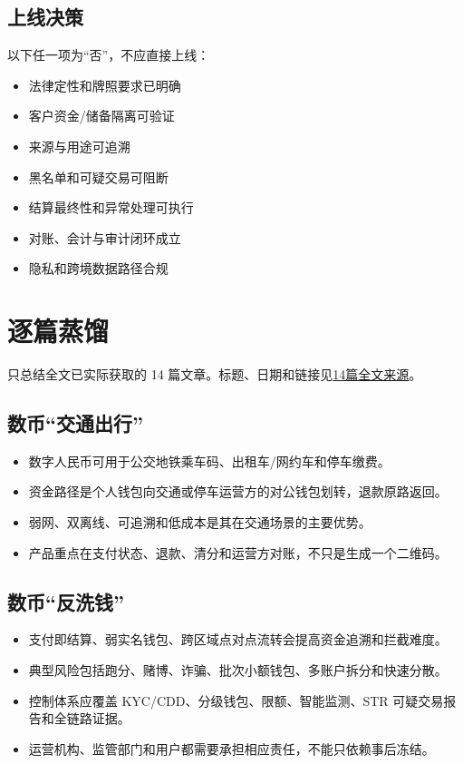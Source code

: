 \section{上线决策}\label{ux4e0aux7ebfux51b3ux7b56}

以下任一项为``否''，不应直接上线：

\begin{itemize}
\tightlist
\item
  法律定性和牌照要求已明确
\item
  客户资金/储备隔离可验证
\item
  来源与用途可追溯
\item
  黑名单和可疑交易可阻断
\item
  结算最终性和异常处理可执行
\item
  对账、会计与审计闭环成立
\item
  隐私和跨境数据路径合规
\end{itemize}

\chapter{逐篇蒸馏}\label{ux9010ux7bc7ux84b8ux998f}

只总结全文已实际获取的 14
篇文章。标题、日期和链接见\href{14篇全文来源.md}{14篇全文来源}。

\section{数币``交通出行''}\label{ux6570ux5e01ux4ea4ux901aux51faux884c}

\begin{itemize}
\tightlist
\item
  数字人民币可用于公交地铁乘车码、出租车/网约车和停车缴费。
\item
  资金路径是个人钱包向交通或停车运营方的对公钱包划转，退款原路返回。
\item
  弱网、双离线、可追溯和低成本是其在交通场景的主要优势。
\item
  产品重点在支付状态、退款、清分和运营方对账，不只是生成一个二维码。
\end{itemize}

\section{数币``反洗钱''}\label{ux6570ux5e01ux53cdux6d17ux94b1}

\begin{itemize}
\tightlist
\item
  支付即结算、弱实名钱包、跨区域点对点流转会提高资金追溯和拦截难度。
\item
  典型风险包括跑分、赌博、诈骗、批次小额钱包、多账户拆分和快速分散。
\item
  控制体系应覆盖 KYC/CDD、分级钱包、限额、智能监测、STR
  可疑交易报告和全链路证据。
\item
  运营机构、监管部门和用户都需要承担相应责任，不能只依赖事后冻结。
\end{itemize}


